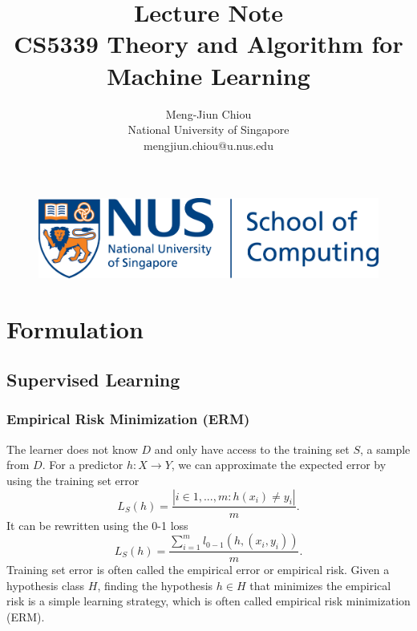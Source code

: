 \documentclass{article}
\title{\textbf{Lecture Note} \\
		\large CS5339 Theory and Algorithm for Machine Learning}
\author{Meng-Jiun Chiou \\ National University of Singapore \\ mengjiun.chiou@u.nus.edu}
\date{}
\begin{document}
    \maketitle 
    \begin{figure}[h!]
    \centering
    \includegraphics[width=.8\columnwidth]{Co-Brand-SoC-H}
    \end{figure}
    
    \clearpage
    
    \tableofcontents
    \clearpage
    
    \section{Formulation}
    \subsection{Supervised Learning}
    \subsubsection{Empirical Risk Minimization (ERM)}
    The learner does not know $D$ and only have access to the training set $S$, a sample from $D$. For a predictor $h: X \rightarrow Y$, we can approximate the expected error by using the training set error
    \begin{equation}
    L_S(h) = \frac{|i \in {1,...,m}:h(x_i) \neq y_i|}{m}.
    \end{equation}
    It can be rewritten using the 0-1 loss
    \begin{equation}
    L_S(h) = \frac{\sum_{i=1}^m l_{0-1}(h, (x_i, y_i))}{m}.
    \end{equation}
    Training set error is often called the empirical error or empirical risk. Given a hypothesis class $H$, finding the hypothesis $h \in H$ that minimizes the empirical risk is a simple learning strategy, which is often called empirical risk minimization (ERM).
    
    
\end{document}

